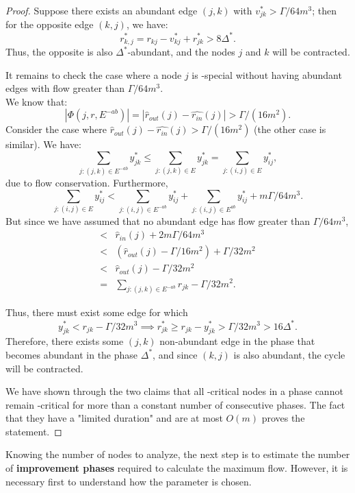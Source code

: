 \begin{proof}
    Suppose there exists an abundant edge \( (j,k) \) with \( v_{jk}^* > \Gamma/64m^3 \); then for the opposite edge \( (k,j) \), we have:
    \[
    r^*_{k,j}= r_{kj}-v^*_{kj}+r^*_{jk}> 8\Delta^*.
    \]
    Thus, the opposite is also \( \Delta^* \)-abundant, and the nodes \( j \) and \( k \) will be contracted.

    It remains to check the case where a node \( j \) is \gmm-special without having abundant edges with flow greater than \( \Gamma/64m^3 \).\\
    We know that:
    \[
    |\Phi (j, r, E^{-ab})| = |\hat{r}_{out}(j)-\hat{r_{in}}(j)|> \Gamma/(16m^2).
    \]
    Consider the case where \( \hat{r}_{out}(j)-\hat{r_{in}}(j)> \Gamma/(16m^2) \) (the other case is similar). We have:
    \[
    \sum_{j:(j,k)\in E^{-ab}}y^*_{jk} \le \sum_{j:(j,k)\in E}y^*_{jk} = \sum_{j:(i,j)\in E}y^*_{ij},
    \]
    due to flow conservation. Furthermore, 
    \[
    \sum_{j:(i,j)\in E}y^*_{ij} < \sum_{j:(i,j)\in E^{-ab}}y^*_{ij} + \sum_{j:(i,j)\in E^{ab}}y^*_{ij}+ m\Gamma/64m^3.
    \]
    But since we have assumed that no abundant edge has flow greater than \( \Gamma/64m^3 \),
    \[
    \begin{array}{rl}
        < & \hat{r}_{in}(j) + 2m\Gamma/64m^3\\
        < & (\hat{r}_{out}(j) - \Gamma/16m^2) + \Gamma/32m^2\\
        < & \hat{r}_{out}(j) - \Gamma/32m^2\\
        = & \sum_{j:(j,k)\in E^{-ab}}r_{jk} - \Gamma/32m^2.
    \end{array}
    \]

    Thus, there must exist some edge for which 
    \[
    y^*_{jk}<r_{jk}-\Gamma/32m^3 \implies r^*_{jk}\ge r_{jk}-y^*_{jk}>\Gamma/32m^3>16\Delta^*.
    \]
    Therefore, there exists some \( (j,k) \) non-abundant edge in the \dlt phase that becomes abundant in the phase \( \Delta^* \), and since \( (k,j) \) is also abundant, the cycle will be contracted. \QED

    We have shown through the two claims that all \gmm-critical nodes in a phase cannot remain \gmm-critical for more than a constant number of consecutive phases. The fact that they have a "limited duration" and are at most \( O(m) \) proves the statement.
\end{proof}

Knowing the number of nodes to analyze, the next step is to estimate the number of \textbf{improvement phases} required to calculate the maximum flow. However, it is necessary first to understand how the \gmm parameter is chosen.

